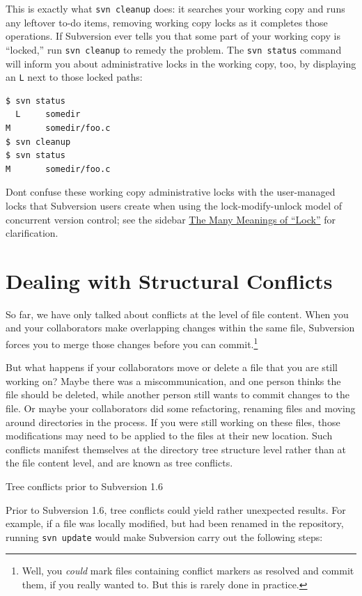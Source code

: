 This is exactly what \texttt{svn\ cleanup} does: it searches your
working copy and runs any leftover to-do items, removing working copy
locks as it completes those operations. If Subversion ever tells you
that some part of your working copy is ``locked,'' run
\texttt{svn\ cleanup} to remedy the problem. The \texttt{svn\ status}
command will inform you about administrative locks in the working copy,
too, by displaying an \texttt{L} next to those locked paths:

\begin{verbatim}
$ svn status
  L     somedir
M       somedir/foo.c
$ svn cleanup
$ svn status
M       somedir/foo.c
\end{verbatim}

Don\textquotesingle t confuse these working copy administrative locks
with the user-managed locks that Subversion users create when using the
lock-modify-unlock model of concurrent version control; see the sidebar
\hyperref[svn.advanced.locking.meanings]{The Many Meanings of ``Lock''}
for clarification.

\section{Dealing with Structural
Conflicts}\label{svn.tour.treeconflicts}

So far, we have only talked about conflicts at the level of file
content. When you and your collaborators make overlapping changes within
the same file, Subversion forces you to merge those changes before you
can commit.\footnote{Well, you \emph{could} mark files containing
  conflict markers as resolved and commit them, if you really wanted to.
  But this is rarely done in practice.}

But what happens if your collaborators move or delete a file that you
are still working on? Maybe there was a miscommunication, and one person
thinks the file should be deleted, while another person still wants to
commit changes to the file. Or maybe your collaborators did some
refactoring, renaming files and moving around directories in the
process. If you were still working on these files, those modifications
may need to be applied to the files at their new location. Such
conflicts manifest themselves at the directory tree structure level
rather than at the file content level, and are known as tree conflicts.

Tree conflicts prior to Subversion 1.6

Prior to Subversion 1.6, tree conflicts could yield rather unexpected
results. For example, if a file was locally modified, but had been
renamed in the repository, running \texttt{svn\ update} would make
Subversion carry out the following steps:


